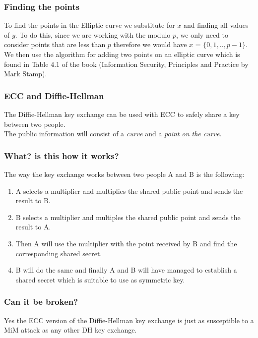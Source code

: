 \documentclass[a4paper]{article}
\begin{document}
\subsubsection{Finding the points}
To find the points in the Elliptic curve we substitute for $x$ and finding all values of $y$. To do this, since we are working with the modulo $p$, we only need to consider points that are less than $p$ therefore we would have $x$ = $\{0,1,..,p-1\}$.\\
We then use the algorithm for adding two points on an elliptic curve which is found in Table 4.1 of the book (Information Security, Principles and Practice by Mark Stamp).

\subsubsection{ECC and Diffie-Hellman}
The Diffie-Hellman key exchange can be used with ECC to safely share a key between two people.\\
The public information will consist of a \textit{curve} and a \textit{point on the curve}.

\subsubsection{What? is this how it works?}
The way the key exchange works between two people A and B is the following:
\begin{enumerate}
    \item A selects a multiplier and multiplies the shared public point and sends the result to B.
    \item B selects a multiplier and multiples the shared public point and sends the result to A.
    \item Then A will use the multiplier with the point received by B and find the corresponding shared secret.
    \item B will do the same and finally A and B will have managed to establish a shared secret which is suitable to use as symmetric key.
\end{enumerate}{}

\subsubsection{Can it be broken?}
Yes the ECC version of the Diffie-Hellman key exchange is just as susceptible to a MiM attack as any other DH key exchange.

\newpage
\end{document}
